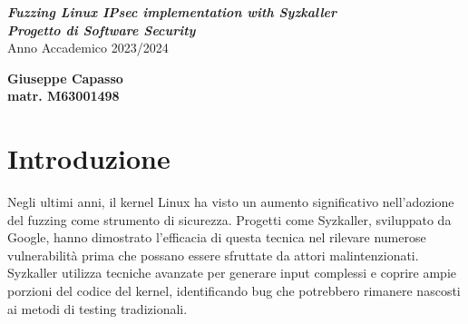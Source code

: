 \documentclass{article}
\author{Giuseppe Capasso}
\begin{document}
\begin{titlepage}
  \thispagestyle{empty}
  \raggedright %


  \vfill

  {\textbf{\textit{\LARGE Fuzzing Linux IPsec implementation with Syzkaller}}}
  \\[2cm]

  {\textbf{\textit{\Large Progetto di Software Security}}}
  \\[1cm]
  {\large Anno Accademico 2023/2024}

  \vfill

  \begin{table}[h]
    \textbf{Giuseppe Capasso}
    \\
    \textbf{matr. M63001498}
  \end{table}

\end{titlepage}

\tableofcontents
\newpage

\section*{Introduzione}
Negli ultimi anni, il kernel Linux ha visto un aumento significativo nell'adozione del
fuzzing come strumento di sicurezza. Progetti come Syzkaller, sviluppato da Google, 
hanno dimostrato l'efficacia di questa tecnica nel rilevare numerose vulnerabilità prima
che possano essere sfruttate da attori malintenzionati. Syzkaller utilizza tecniche
avanzate per generare input complessi e coprire ampie porzioni del codice del kernel,
identificando bug che potrebbero rimanere nascosti ai metodi di testing tradizionali.
\end{document}
